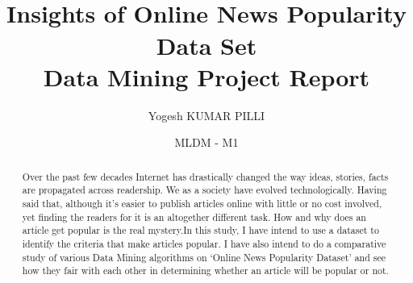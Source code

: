 \documentclass[sigchi]{acmart}
\begin{document}
\title{\\Insights of Online News Popularity Data Set\\ Data Mining Project Report}
\author{Yogesh KUMAR PILLI}
\author{ MLDM - M1 }




\renewcommand{\shortauthors}{Yogesh Kumar Pilli}

\begin{abstract}
  Over the past few decades Internet has drastically changed the way ideas, stories, facts are propagated across readership. We as a society have evolved technologically. Having said that, although it’s easier to publish articles online with little or no cost involved, yet finding the readers for it is an altogether different task. How and why does an article get popular is the real mystery.In this study, I have intend to use a dataset to identify the criteria that make articles popular. I have also intend to do a comparative study of various Data Mining algorithms on ‘Online News Popularity Dataset’ and see how they fair with each other in determining whether an article will be popular or not. 
\end{abstract}



\makeatletter
\def\@copyrightspace{\relax}
\makeatother
\maketitle
\end{document}
